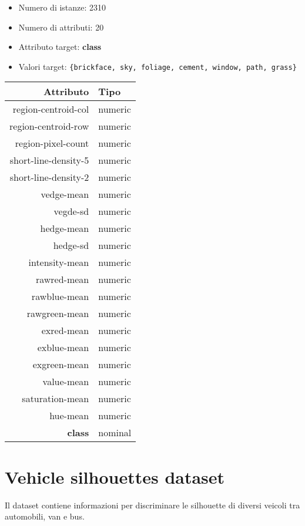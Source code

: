 \begin{itemize}
	\item Numero di istanze: 2310
	\item Numero di attributi: 20
	\item Attributo target: \textbf{class}
	\item Valori target: \texttt{\{brickface, sky, foliage, cement, window, path, grass\}}
\end{itemize}

\begin{table}[!htb]
	\centering
	\begin{tabular}{|r|l|}
		\hline
		Attributo & Tipo \\
		\hline
		region-centroid-col & numeric \\ 
		region-centroid-row & numeric \\ 
		region-pixel-count & numeric \\ 
		short-line-density-5 & numeric \\ 
		short-line-density-2 & numeric \\ 
		vedge-mean & numeric \\ 
		vegde-sd & numeric \\ 
		hedge-mean & numeric \\ 
		hedge-sd & numeric \\ 
		intensity-mean & numeric \\ 
		rawred-mean & numeric \\ 
		rawblue-mean & numeric \\ 
		rawgreen-mean & numeric \\ 
		exred-mean & numeric \\ 
		exblue-mean & numeric \\ 
		exgreen-mean & numeric \\ 
		value-mean & numeric \\ 
		saturation-mean & numeric \\ 
		hue-mean & numeric \\ 
		\textbf{class} & nominal \\ 
		\hline
	\end{tabular}
\end{table}

\pagebreak

\section{Vehicle silhouettes dataset}

Il dataset contiene informazioni per discriminare le silhouette di diversi veicoli tra automobili, van e bus.

